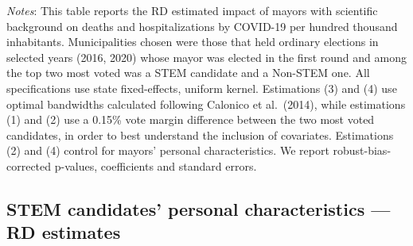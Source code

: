 \documentclass[
  letterpaper,
  DIV=11,
  numbers=noendperiod]{scrartcl}
\begin{document}
\emph{Notes}: This table reports the RD estimated impact of mayors with
scientific background on deaths and hospitalizations by COVID-19 per
hundred thousand inhabitants. Municipalities chosen were those that held
ordinary elections in selected years (2016, 2020) whose mayor was
elected in the first round and among the top two most voted was a STEM
candidate and a Non-STEM one. All specifications use state
fixed-effects, uniform kernel. Estimations (3) and (4) use optimal
bandwidths calculated following Calonico et al.~(2014), while
estimations (1) and (2) use a 0.15\% vote margin difference between the
two most voted candidates, in order to best understand the inclusion of
covariates. Estimations (2) and (4) control for mayors' personal
characteristics. We report robust-bias-corrected p-values, coefficients
and standard errors.

\subsection{STEM candidates' personal characteristics --- RD
estimates}\label{stem-candidates-personal-characteristics-rd-estimates}
\end{document}
